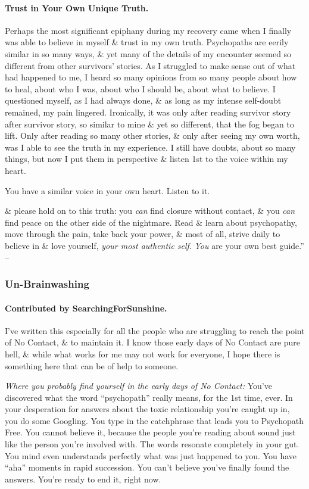 \documentclass{article}
\numberwithin{equation}{section}
\begin{document}
\paragraph{Trust in Your Own Unique Truth.} Perhaps the most significant epiphany during my recovery came when I finally was able to believe in myself \& trust in my own truth. Psychopaths are eerily similar in so many ways, \& yet many of the details of my encounter seemed so different from other survivors' stories. As I struggled to make sense out of what had happened to me, I heard so many opinions from so many people about how to heal, about who I was, about who I should be, about what to believe. I questioned myself, as I had always done, \& as long as my intense self-doubt remained, my pain lingered. Ironically, it was only after reading survivor story after survivor story, so similar to mine \& yet so different, that the fog began to lift. Only after reading so many other stories, \& only after seeing my own worth, was I able to see the truth in my experience. I still have doubts, about so many things, but now I put them in perspective \& listen 1st to the voice within my heart.

You have a similar voice in your own heart. Listen to it.

\& please hold on to this truth: you \textit{can} find closure without contact, \& you \textit{can} find peace on the other side of the nightmare. Read \& learn about psychopathy, move through the pain, take back your power, \& most of all, strive daily to believe in \& love yourself, \textit{your most authentic self}. \textit{You} are your own best guide.'' -- \cite[pp. 103--107]{MacKenzie2015}

\subsubsection{Un-Brainwashing}

\paragraph{Contributed by SearchingForSunshine.} I've written this especially for all the people who are struggling to reach the point of No Contact, \& to maintain it. I know those early days of No Contact are pure hell, \& while what works for me may not work for everyone, I hope there is something here that can be of help to someone.

\textit{Where you probably find yourself in the early days of No Contact:} You've discovered what the word ``psychopath'' really means, for the 1st time, ever. In your desperation for answers about the toxic relationship you're caught up in, you do some Googling. You type in the catchphrase that leads you to Psychopath Free. You cannot believe it, because the people you're reading about sound just like the person you're involved with. The words resonate completely in your gut. You mind even understands perfectly what was just happened to you. You have ``aha'' moments in rapid succession. You can't believe you've finally found the answers. You're ready to end it, right now.
\end{document}
